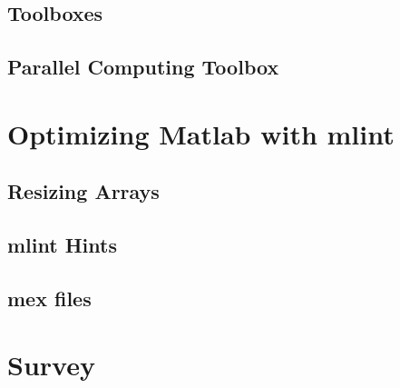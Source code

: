 \documentclass[handout]{beamer}
\begin{document}
   \subsection {Toolboxes}
   \subsection {Parallel Computing Toolbox}
  \section{Optimizing Matlab with mlint}
   \subsection {Resizing Arrays}
   \subsection {mlint Hints}
   \subsection {mex files}
  \section{ Survey }
\end{document}
